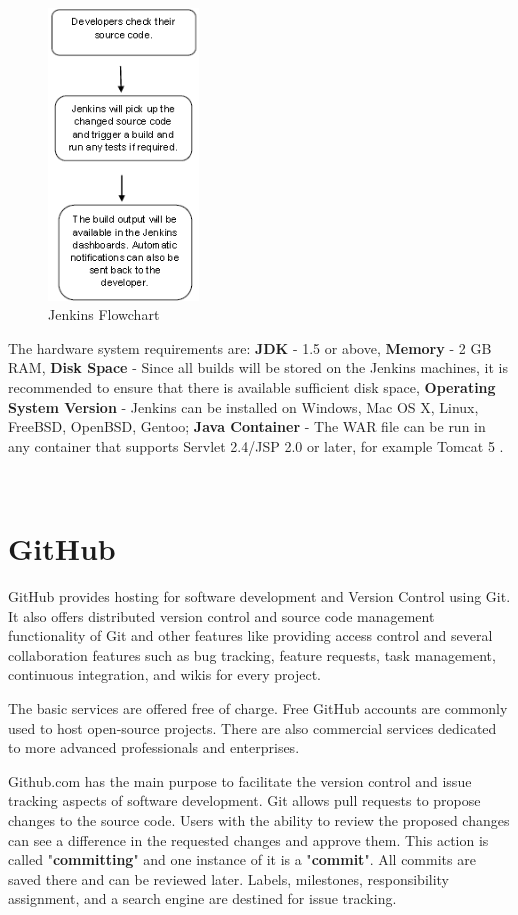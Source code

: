 \documentclass[12pt,a4paper,twoside]{article}
\begin{document}
\begin{figure}[H]
    \centering
        \includegraphics[width=4cm]{images-aws/jenkins_flowchart.png}
        \caption{Jenkins Flowchart \cite{JENKINS-FLOWCHART}}
\end{figure}


The hardware system requirements are: \textbf{JDK} - 1.5 or above, \textbf{Memory} - 2 GB RAM, 
 \textbf{Disk Space} - Since all builds will be stored on the Jenkins machines, it is recommended to ensure that there is available sufficient disk space, \textbf{Operating System Version} - Jenkins can be installed on Windows, Mac OS X, Linux, FreeBSD, OpenBSD, Gentoo; \textbf{Java Container} - The WAR file can be run in any container that supports Servlet 2.4/JSP 2.0 or later, for example Tomcat 5 \cite{JENKINS-FLOWCHART}.




~\newpage


\section{GitHub}


GitHub provides hosting for software development and Version Control using Git. It also offers distributed version control and source code management functionality of Git and other features like providing access control and several collaboration features such as bug tracking, feature requests, task management, continuous integration, and wikis for every project.


The basic services are offered free of charge. Free GitHub accounts are commonly used to host open-source projects. There are also commercial services dedicated to more advanced professionals and enterprises.


Github.com has the main purpose to facilitate the version control and issue tracking aspects of software development. Git allows pull requests to propose changes to the source code. Users with the ability to review the proposed changes can see a difference in the requested changes and approve them. This action is called "\textbf{committing}" and one instance of it is a "\textbf{commit}". All commits are saved there and can be reviewed later.
Labels, milestones, responsibility assignment, and a search engine are destined for issue tracking.
\end{document}
